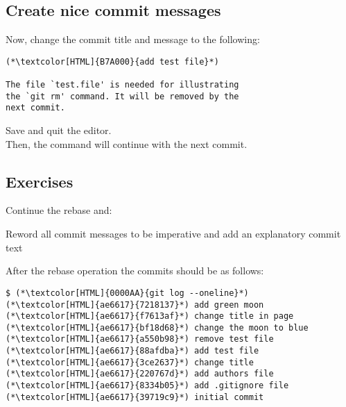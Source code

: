 \subsection{Create nice commit messages}
\begin{frame}[fragile]
  \subslidetitle

  Now, change the commit title and message to the following:\\
  \begin{lstlisting}
(*\textcolor[HTML]{B7A000}{add test file}*)

The file `test.file' is needed for illustrating
the `git rm' command. It will be removed by the
next commit.
\end{lstlisting}

  \vspace{1em}
  Save and quit the editor.
  \\

  \vspace{1em}
  Then, the  command will continue with the next commit.
\end{frame}

\subsection{Exercises}
\begin{frame}[fragile]
  \subslidetitle
  Continue the rebase and:
  \begin{exercise}
    \item Reword all commit messages to be imperative and add an explanatory commit text
  \end{exercise}

  \vspace{1em}
  After the rebase operation the commits should be as follows:
  \begin{lstlisting}
$ (*\textcolor[HTML]{0000AA}{git log --oneline}*)
(*\textcolor[HTML]{ae6617}{7218137}*) add green moon
(*\textcolor[HTML]{ae6617}{f7613af}*) change title in page
(*\textcolor[HTML]{ae6617}{bf18d68}*) change the moon to blue
(*\textcolor[HTML]{ae6617}{a550b98}*) remove test file
(*\textcolor[HTML]{ae6617}{88afdba}*) add test file
(*\textcolor[HTML]{ae6617}{3ce2637}*) change title
(*\textcolor[HTML]{ae6617}{220767d}*) add authors file
(*\textcolor[HTML]{ae6617}{8334b05}*) add .gitignore file
(*\textcolor[HTML]{ae6617}{39719c9}*) initial commit
\end{lstlisting}
\end{frame}

